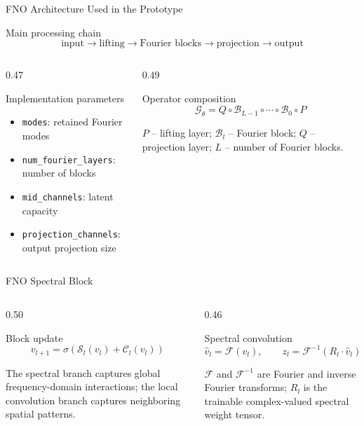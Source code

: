 \documentclass[aspectratio=169,10pt]{beamer}
\begin{document}
\begin{frame}{FNO Architecture Used in the Prototype}
  \begin{block}{Main processing chain}
    \[
      \text{input}\rightarrow\text{lifting}\rightarrow
      \text{Fourier blocks}\rightarrow\text{projection}\rightarrow\text{output}
    \]
  \end{block}
  \vskip 4pt
  \begin{columns}[T]
    \begin{column}{0.47\textwidth}
      \footnotesize
      \begin{block}{Implementation parameters}
        \begin{itemize}
          \item \texttt{modes}: retained Fourier modes
          \item \texttt{num\_fourier\_layers}: number of blocks
          \item \texttt{mid\_channels}: latent capacity
          \item \texttt{projection\_channels}: output projection size
        \end{itemize}
      \end{block}
    \end{column}
    \begin{column}{0.49\textwidth}
      \begin{block}{Operator composition}
        \[
          \mathcal{G}_{\theta}=Q\circ\mathcal{B}_{L-1}\circ\cdots
          \circ\mathcal{B}_0\circ P
        \]
      \end{block}
      \scriptsize
      $P$ -- lifting layer; $\mathcal{B}_l$ -- Fourier block;
      $Q$ -- projection layer; $L$ -- number of Fourier blocks.
    \end{column}
  \end{columns}
\end{frame}

\begin{frame}{FNO Spectral Block}
  \begin{columns}[T]
    \begin{column}{0.50\textwidth}
      \begin{block}{Block update}
        \[
          v_{l+1}=\sigma\left(\mathcal{S}_l(v_l)+\mathcal{C}_l(v_l)\right)
        \]
      \end{block}
      \footnotesize
      The spectral branch captures global frequency-domain interactions;
      the local convolution branch captures neighboring spatial patterns.
    \end{column}
    \begin{column}{0.46\textwidth}
      \begin{block}{Spectral convolution}
        \[
          \hat{v}_l=\mathcal{F}(v_l),\qquad
          z_l=\mathcal{F}^{-1}\left(R_l\cdot\hat{v}_l\right)
        \]
      \end{block}
      \scriptsize
      $\mathcal{F}$ and $\mathcal{F}^{-1}$ are Fourier and inverse Fourier
      transforms; $R_l$ is the trainable complex-valued spectral weight tensor.
    \end{column}
  \end{columns}
\end{frame}
\end{document}
